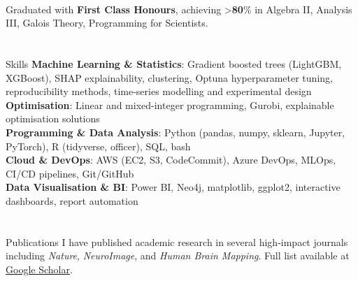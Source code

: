 \documentclass{my_cv}
\begin{document}
% 
\\ Graduated with \textbf{First Class Honours}, achieving >\textbf{80}\% in Algebra II, Analysis III, Galois Theory, Programming for Scientists.

\vspace{-0.2cm}  
\section{\faCogs}{Skills}
{
\textbf{Machine Learning \& Statistics}: Gradient boosted trees (LightGBM, XGBoost), SHAP explainability, clustering, Optuna hyperparameter tuning, reproducibility methods, time-series modelling and experimental design \\
\textbf{Optimisation}: Linear and mixed-integer programming, Gurobi, explainable optimisation solutions \\
\textbf{Programming \& Data Analysis}: Python (pandas, numpy, sklearn, Jupyter, PyTorch), R (tidyverse, officer), SQL, bash \\
\textbf{Cloud \& DevOps}: AWS (EC2, S3, CodeCommit), Azure DevOps, MLOps, CI/CD pipelines, Git/GitHub \\
\textbf{Data Visualisation \& BI}: Power BI, Neo4j, matplotlib, ggplot2, interactive dashboards, report automation
}
\vspace{-0.2cm} 
\section{\faPencil}{Publications}
{
I have published academic research in several high-impact journals including \textit{Nature}, \textit{NeuroImage}, and \textit{Human Brain Mapping}. Full list available at \href{https://scholar.google.com/citations?user=h4aoOucAAAAJ}{Google Scholar}.
%
}
    
\end{document}

